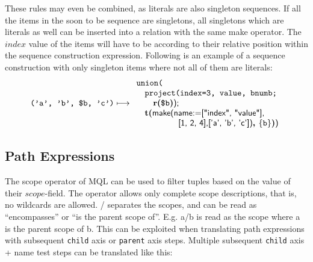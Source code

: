 These rules may even be combined, as literals are also singleton sequences. If all the items in the soon to 
be sequence are singletons, all singletons which are literals as well can be inserted into a relation with
the same \textsf{make} operator. The $index$ value of the items will have to be according to their relative 
position within the sequence construction expression. Following is an example of a sequence construction with
only singleton items where not all of them are literals:
\begin{equation*}
\mbox{\texttt{('a', 'b', \$b, 'c')}}\longmapsto
\begin{array}{l}
\mbox{\texttt{union(}} \\ \quad
\mbox{\texttt{project(index=3, value, bnumb;}} \\ \quad \quad
\mbox{\textbf{r(}}\texttt{\$b}\mbox{\textbf{)}\textsf{);}} \\ \quad
\mbox{\textbf{t(}}
\mbox{\textsf{make(name:=["index", "value"],}} \\ \quad \quad \quad \quad \quad 
\mbox{\textsf{[1, 2, 4],['a', 'b', 'c'])}\textbf{,
}}\{\mbox{\texttt{b}}\}\mbox{\textbf{)}\textsf{)}}
\end{array}
\end{equation*}
      

\subsection{Path Expressions}
\label{sect:trans:TD:simpl:pathExpr}
The \textsf{scope} operator of MQL can be used to filter tuples based on the value of their $scope$-field. The
operator allows only complete scope descriptions, that is, no wildcards are allowed. \textsf{/} separates the
scopes, and can be read as ``encompasses'' or ``is the parent scope of''. E.g. \textsf{a/b} is read as the scope
where \textsf{a} is the parent scope of \textsf{b}. This can be exploited when translating path expressions with
subsequent \texttt{child} axis or \texttt{parent} axis steps. Multiple subsequent \texttt{child} axis + name test
steps can be translated like this:

